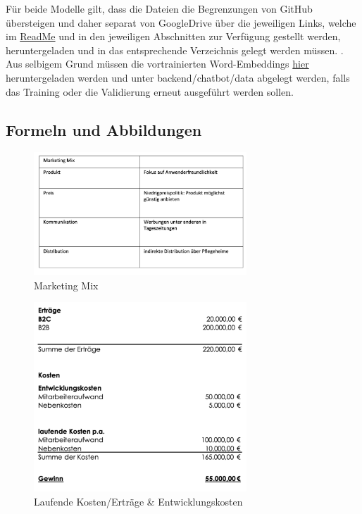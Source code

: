 \documentclass{aa}
\begin{document}
    Für beide Modelle gilt, dass die Dateien die Begrenzungen von GitHub übersteigen und daher separat von GoogleDrive über die jeweiligen Links, welche im \href{https://github.com/SimonScapan/AuntElisa/tree/master/backend/chatbot}{ReadMe} und in den jeweiligen Abschnitten zur Verfügung gestellt werden, heruntergeladen und in das entsprechende Verzeichnis gelegt werden müssen. \cite[Vgl.]{auntelisa}. Aus selbigem Grund müssen die vortrainierten Word-Embeddings \href{https://www.kaggle.com/watts2/glove6b50dtxt/download}{hier} heruntergeladen werden und unter backend/chatbot/data abgelegt werden, falls das Training oder die Validierung erneut ausgeführt werden sollen.
    
    \subsection{Formeln und Abbildungen}
         \begin{figure}[h]
         \centering
         \includegraphics[width=8cm]{Marketing_Mix.png}
         \caption{Marketing Mix}
         \label{fig:Marketing_Mix}
        \end{figure}
        
         \begin{figure}[h]
         \centering
         \includegraphics[width=8cm]{Ertrag_Jahr01.png}
         \caption{Laufende Kosten/Erträge & Entwicklungskosten }
         \label{fig:Ertrag_Jahr01}
        \end{figure}
         
\end{document}
